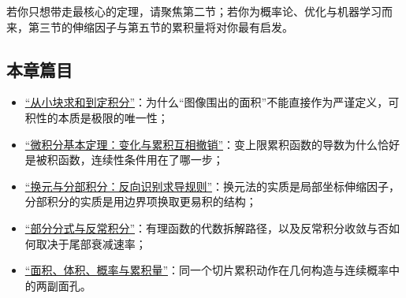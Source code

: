 若你只想带走最核心的定理，请聚焦第二节；若你为概率论、优化与机器学习而来，第三节的伸缩因子与第五节的累积量将对你最有启发。

\subsection{本章篇目}

\begin{itemize}
\item \hyperref[sec:02-Calculus/04-Integration/01]{“从小块求和到定积分”}：为什么“图像围出的面积”不能直接作为严谨定义，可积性的本质是极限的唯一性；
\item \hyperref[sec:02-Calculus/04-Integration/02]{“微积分基本定理：变化与累积互相撤销”}：变上限累积函数的导数为什么恰好是被积函数，连续性条件用在了哪一步；
\item \hyperref[sec:02-Calculus/04-Integration/03]{“换元与分部积分：反向识别求导规则”}：换元法的实质是局部坐标伸缩因子，分部积分的实质是用边界项换取更易积的结构；
\item \hyperref[sec:02-Calculus/04-Integration/04]{“部分分式与反常积分”}：有理函数的代数拆解路径，以及反常积分收敛与否如何取决于尾部衰减速率；
\item \hyperref[sec:02-Calculus/04-Integration/05]{“面积、体积、概率与累积量”}：同一个切片累积动作在几何构造与连续概率中的两副面孔。
\end{itemize}